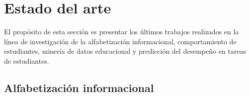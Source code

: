 \section{Estado del arte}
\label{sec:estado_arte}
El propósito de esta sección es presentar los últimos trabajos realizados en la línea de investigación de la alfabetización informacional, comportamiento de estudiantes, minería de datos educacional y predicción del desempeño en tareas de estudiantes.

\subsection{Alfabetización informacional}


